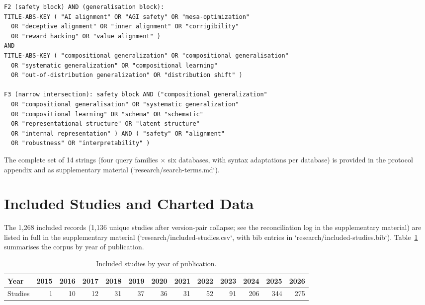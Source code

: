 \begin{verbatim}
F2 (safety block) AND (generalisation block):
TITLE-ABS-KEY ( "AI alignment" OR "AGI safety" OR "mesa-optimization"
  OR "deceptive alignment" OR "inner alignment" OR "corrigibility"
  OR "reward hacking" OR "value alignment" )
AND
TITLE-ABS-KEY ( "compositional generalization" OR "compositional generalisation"
  OR "systematic generalization" OR "compositional learning"
  OR "out-of-distribution generalization" OR "distribution shift" )

F3 (narrow intersection): safety block AND ("compositional generalization"
  OR "compositional generalisation" OR "systematic generalization"
  OR "compositional learning" OR "schema" OR "schematic"
  OR "representational structure" OR "latent structure"
  OR "internal representation" ) AND ( "safety" OR "alignment"
  OR "robustness" OR "interpretability" )
\end{verbatim}

The complete set of 14 strings (four query families $\times$ six databases, with syntax adaptations per database) is provided in the protocol appendix and as supplementary material (`research/search-terms.md`).

\section{Included Studies and Charted Data}\label{app:studies}

The 1,268 included records (1,136 unique studies after version-pair collapse; see the reconciliation log in the supplementary material) are listed in full in the supplementary material (`research/included-studies.csv`, with bib entries in `research/included-studies.bib`). Table~\ref{tab:year} summarises the corpus by year of publication.

\begin{table}[htbp]
\centering
\caption{Included studies by year of publication.}
\label{tab:year}
\begin{tabular}{lrrrrrrrrrrrr}
\toprule
Year & 2015 & 2016 & 2017 & 2018 & 2019 & 2020 & 2021 & 2022 & 2023 & 2024 & 2025 & 2026 \\
\midrule
Studies & 1 & 10 & 12 & 31 & 37 & 36 & 31 & 52 & 91 & 206 & 344 & 275 \\
\bottomrule
\end{tabular}
\end{table}

